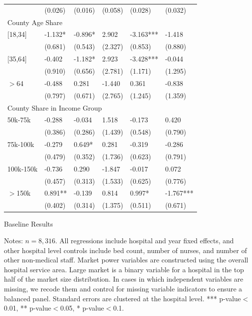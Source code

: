 \documentclass[12pt]{article}
\begin{document}
{\begin{tabular}{llllll}
							&	(0.026)	&	(0.016)	&	(0.058)	&	(0.028)	&	(0.032)	\\
\multicolumn{6}{l}{County Age Share}\\											
\hspace{0.1in}[18,34]			&	-1.132*	&	-0.896*	&	2.902	&	-3.163***	&	-1.418	\\
							&	(0.681)	&	(0.543)	&	(2.327)	&	(0.853)	&	(0.880)	\\
\hspace{0.1in}[35,64]			&	-0.402	&	-1.182*	&	2.923	&	-3.428***	&	-0.044	\\
							&	(0.910)&	(0.656)	&	(2.781)	&	(1.171)	&	(1.295)	\\
\hspace{0.1in} $>$64			&	-0.488	&	0.281	&	-1.440	&	0.361	&	-0.838	\\
							&	(0.797)	&	(0.671)	&	(2.765)	&	(1.245)	&	(1.359)	\\
\multicolumn{6}{l}{County Share in Income Group}\\											
\hspace{0.1in} 50k-75k			&	-0.288	&	-0.034	&	1.518	&	-0.173	&	0.420	\\
							&	(0.386)	&	(0.286)	&	(1.439)	&	(0.548)	&	(0.790)	\\
\hspace{0.1in} 75k-100k			&	-0.279	&	0.649*	&	0.281	&	-0.319	&	-0.286	\\
							&	(0.479)	&	(0.352)	&	(1.736)	&	(0.623)	&	(0.791)	\\
\hspace{0.1in} 100k-150k			&	-0.736	&	0.290	&	-1.847	&	-0.017	&	0.072	\\
							&	(0.457)	&	(0.313)	&	(1.533)	&	(0.625)	&	(0.776)	\\
\hspace{0.1in}$>$150k			&	0.891**	&	-0.139	&	0.814	&	0.997*	&	-1.767***	\\
							&	(0.402)	&	(0.314)	&	(1.375)	&	(0.511)	&	(0.671)	\\
\hline
\end{tabular}
}
\setlength{\captionmargin}{.5 \textwidth} \addtolength{\captionmargin}{-.5\wd\gfxbox}
\begin{table}[htbp!]
\centering
\caption{Baseline Results}
\label{tab:baselineresults}
\usebox{\gfxbox}
\par
\begin{minipage}{\wd\gfxbox}
\footnotesize
Notes: $n=8,316$.  All regressions include hospital and year fixed effects, and other hospital level controls include bed count, number of nurses, and number of other non-medical staff.  Market power variables are constructed using the overall hospital service area.  Large market is a binary variable for a hospital in the top half of the market size distribution.  In cases in which independent variables are missing, we recode them and control for missing variable indicators to ensure a balanced panel.  Standard errors are clustered at the hospital level.  *** p-value$<$0.01, ** p-value$<$0.05, * p-value$<$0.1.
\end{minipage}
\end{table}
\end{document}
